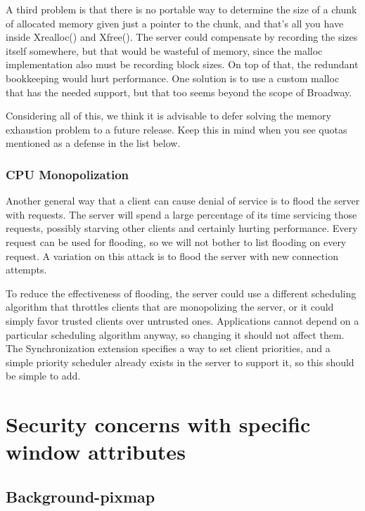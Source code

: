 \documentclass{article}
\begin{document}
A third problem is that there is no portable way to determine the size
of a chunk of allocated memory given just a pointer to the chunk, and
that's all you have inside Xrealloc() and Xfree().  The server could
compensate by recording the sizes itself somewhere, but that would be
wasteful of memory, since the malloc implementation also must be
recording block sizes.  On top of that, the redundant bookkeeping
would hurt performance.  One solution is to use a custom malloc that
has the needed support, but that too seems beyond the scope of
Broadway.

Considering all of this, we think it is advisable to defer solving the
memory exhaustion problem to a future release.  Keep this in mind when
you see quotas mentioned as a defense in the list below.

\subsubsection{CPU Monopolization}

Another general way that a client can cause denial of service is to
flood the server with requests.  The server will spend a large
percentage of its time servicing those requests, possibly starving
other clients and certainly hurting performance.  Every request can be
used for flooding, so we will not bother to list flooding on every
request.  A variation on this attack is to flood the server with new
connection attempts.

To reduce the effectiveness of flooding, the server could use a
different scheduling algorithm that throttles clients that are
monopolizing the server, or it could simply favor trusted clients over
untrusted ones.  Applications cannot depend on a particular scheduling
algorithm anyway, so changing it should not affect them.  The
Synchronization extension specifies a way to set client priorities,
and a simple priority scheduler already exists in the server to
support it, so this should be simple to add.



\section{Security concerns with specific window attributes}

\subsection{Background-pixmap}
\end{document}
